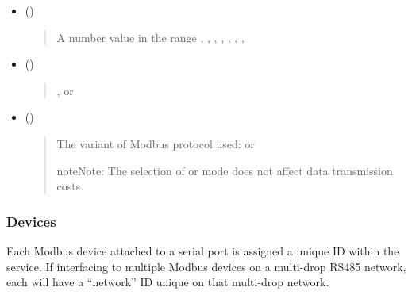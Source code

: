 \documentclass[letterpaper,10pt,english]{sphinxmanual}
\begin{document}
\begin{itemize}
\item {} 
 ()
\begin{quote}

A number value in the range , , , , , , , 
\end{quote}

\item {} 
 ()
\begin{quote}

,  or 
\end{quote}

\item {} 
 ()
\begin{quote}

The variant of Modbus protocol used:  or 

\begin{sphinxadmonition}{note}{Note:}
The selection of  or  mode does not affect data transmission costs.
\end{sphinxadmonition}
\end{quote}

\end{itemize}


\subsubsection{Devices}
\label{\detokenize{configuration:devices}}\label{\detokenize{configuration:id2}}
Each Modbus device attached to a serial port is assigned a unique ID within the service.  If interfacing to multiple Modbus devices on a multi-drop RS485 network, each  will have a “network” ID unique on that multi-drop network.
\end{document}

